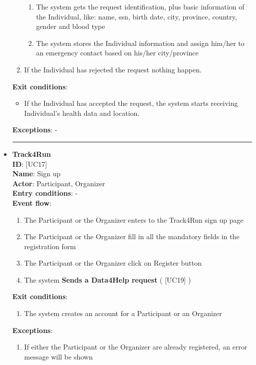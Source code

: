 \documentclass[a4paper, hidelinks, 12pt]{report}
\newcommand\usecase[1]{ [UC#1] }
\begin{document}
\begin{itemize}
\begin{enumerate}
			\begin{enumerate}
				\item{The system gets the request identification, plus basic information of the Individual, like: name, ssn, birth date, city, province, country, gender and blood type}
				\item{The system stores the Individual information and assign him/her to an emergency contact based on his/her city/province}			
			\end{enumerate}
			\item{If the Individual has rejected the request nothing happen.}
		\end{enumerate}
		\textbf{Exit conditions}:
		\begin{itemize}
			\item{If the Individual has accepted the request, the system starts receiving Individual's health data and location.}
		\end{itemize}
		\textbf{Exceptions}: - \\
		\rule{\linewidth}{0.4pt}
		\item{\textbf{Track4Run}}\\
		\textbf{ID}: \usecase{17} \\
		\textbf{Name}: Sign up \\
		\textbf{Actor}: Participant, Organizer \\
		\textbf{Entry conditions}: - \\
		\textbf{Event flow}:
		\begin{enumerate}
			\item{The Participant or the Organizer enters to the Track4Run sign up page}
			\item{The Participant or the Organizer fill in all the mandatory fields in the registration form}
			\item{The Participant or the Organizer click on Register button}
			\item{The system \textbf{Sends a Data4Help request} (\usecase{19})}
		\end{enumerate}
		\textbf{Exit conditions}:
		\begin{enumerate}
			\item{The system creates an account for a Participant or an Organizer}
		\end{enumerate}
		\textbf{Exceptions}:
		\begin{enumerate}
			\item{If either the Participant or the Organizer are already registered, an error message will be shown}

\end{enumerate}
\end{itemize}
\end{document}

